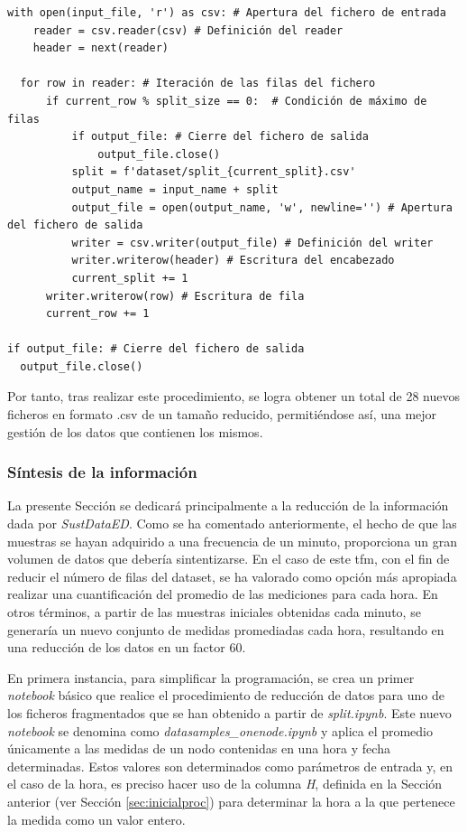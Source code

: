 \begin{lstlisting}[style=Python, caption={Fragmentación de ficheros iniciales}]
  with open(input_file, 'r') as csv: # Apertura del fichero de entrada
    reader = csv.reader(csv) # Definición del reader
    header = next(reader)  

  for row in reader: # Iteración de las filas del fichero
      if current_row % split_size == 0:  # Condición de máximo de filas
          if output_file: # Cierre del fichero de salida 
              output_file.close()
          split = f'dataset/split_{current_split}.csv'
          output_name = input_name + split
          output_file = open(output_name, 'w', newline='') # Apertura del fichero de salida
          writer = csv.writer(output_file) # Definición del writer
          writer.writerow(header) # Escritura del encabezado
          current_split += 1
      writer.writerow(row) # Escritura de fila
      current_row += 1

if output_file: # Cierre del fichero de salida
  output_file.close()
\end{lstlisting}

\vspace{3mm}

Por tanto, tras realizar este procedimiento, se logra obtener un total de 28 nuevos ficheros en formato .csv de un tamaño reducido, permitiéndose así, una mejor gestión de los datos que contienen los mismos.

\subsubsection{Síntesis de la información}
\label{sec:datasamples}

La presente Sección se dedicará principalmente a la reducción de la información dada por \textit{SustDataED}. Como se ha comentado anteriormente, el hecho de que las muestras se hayan adquirido a una frecuencia de un minuto, proporciona un gran volumen de datos que debería sintentizarse. En el caso de este \gls{tfm}, con el fin de reducir el número de filas del dataset, se ha valorado como opción más apropiada realizar una cuantificación del promedio de las mediciones para cada hora. En otros términos, a partir de las muestras iniciales obtenidas cada minuto, se generaría un nuevo conjunto de medidas promediadas cada hora, resultando en una reducción de los datos en un factor 60.

\vspace{3mm}

En primera instancia, para simplificar la programación, se crea un primer \textit{notebook} básico que realice el procedimiento de reducción de datos para uno de los ficheros fragmentados que se han obtenido a partir de \textit{split.ipynb}. Este nuevo \textit{notebook} se denomina como \textit{datasamples\_onenode.ipynb} y aplica el promedio únicamente a las medidas de un nodo contenidas en una hora y fecha determinadas. Estos valores son determinados como parámetros de entrada y, en el caso de la hora, es preciso hacer uso de la columna \textit{H}, definida en la Sección anterior (ver Sección \ref{sec:inicialproc}) para determinar la hora a la que pertenece la medida como un valor entero.

